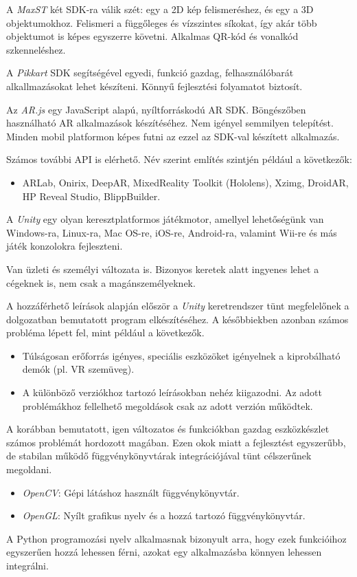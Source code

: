 
A \textit{MaxST} két SDK-ra válik szét: egy a 2D kép felismeréshez, és egy a 3D objektumokhoz.
Felismeri a függőleges és vízszintes síkokat, így akár több objektumot is képes egyszerre követni. Alkalmas QR-kód és vonalkód szkenneléshez.


A \textit{Pikkart} SDK segítségével egyedi, funkció gazdag, felhasználóbarát alkallmazásokat lehet készíteni. Könnyű fejlesztési folyamatot biztosít.


Az \textit{AR.js} egy JavaScript alapú, nyíltforráskodú AR SDK. Böngészőben használható AR alkalmazások készítéséhez. Nem igényel semmilyen telepítést. Minden mobil platformon képes futni az ezzel az SDK-val készített alkalmazás.


Számos további API is elérhető. Név szerint említés szintjén például a következők:
\begin{itemize}
\item ARLab,
Onirix,
DeepAR,
MixedReality Toolkit (Hololens),
Xzimg,
DroidAR,
HP Reveal Studio,
BlippBuilder.
\end{itemize}


A \textit{Unity} egy  olyan keresztplatformos játékmotor, amellyel lehetőségünk van Windows-ra, Linux-ra, Mac OS-re, iOS-re, Android-ra, valamint Wii-re és más játék konzolokra fejleszteni.

Van üzleti és személyi változata is. Bizonyos keretek alatt ingyenes lehet a cégeknek is, nem csak a magánszemélyeknek.

A hozzáférhető leírások alapján először a \textit{Unity} keretrendszer tünt megfelelőnek a dolgozatban bemutatott program elkészítéséhez.
A későbbiekben azonban számos probléma lépett fel, mint például a következők.
\begin{itemize}
	\item Túlságosan erőforrás igényes, speciális eszközöket igényelnek a kiprobálható demók (pl. VR szemüveg).
	\item A különböző verziókhoz tartozó leírásokban nehéz kiigazodni. Az adott problémákhoz fellelhető megoldások csak az adott verzión működtek.
\end{itemize}


A korábban bemutatott, igen változatos és funkciókban gazdag eszközkészlet számos problémát hordozott magában.
Ezen okok miatt a fejlesztést egyszerűbb, de stabilan működő függvénykönyvtárak integrációjával tünt célszerűnek megoldani.
\begin{itemize}
	\item \textit{OpenCV}: Gépi látáshoz használt függvénykönyvtár.
	\item \textit{OpenGL}: Nyílt grafikus nyelv és a hozzá tartozó függvénykönyvtár.
\end{itemize}
A Python programozási nyelv alkalmasnak bizonyult arra, hogy ezek funkcióihoz egyszerűen hozzá lehessen férni, azokat egy alkalmazásba könnyen lehessen integrálni.
